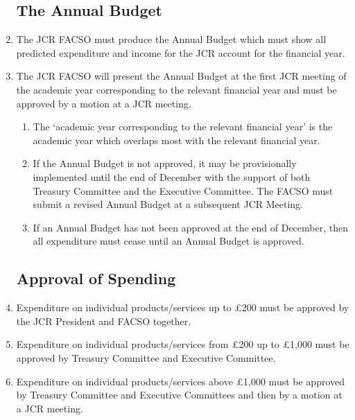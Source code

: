 \documentclass[12pt]{article}  %
\begin{document}
\begin{enumerate}
    \subsection{The Annual Budget}
    \item The JCR FACSO must produce the Annual Budget which must show all predicted expenditure and income for the JCR account for the financial year.
    \item The JCR FACSO will present the Annual Budget at the first JCR meeting of the academic year corresponding to the relevant financial year and must be approved by a motion at a JCR meeting.
    \begin{enumerate}
        \item The ‘academic year corresponding to the relevant financial year’ is the academic year which overlaps most with the relevant financial year.
        \item If the Annual Budget is not approved, it may be provisionally implemented until the end of December with the support of both Treasury Committee and the Executive Committee. The FACSO must submit a revised Annual Budget at a subsequent JCR Meeting.
        \item If an Annual Budget has not been approved at the end of December, then all expenditure must cease until an Annual Budget is approved.
    \end{enumerate}
    \subsection{Approval of Spending}
    \item Expenditure on individual products/services up to £200 must be approved by the JCR President and FACSO together.
    \item Expenditure on individual products/services from £200 up to £1,000 must be approved by Treasury Committee and Executive Committee.
    \item Expenditure on individual products/services above £1,000 must be approved by Treasury Committee and Executive Committees and then by a motion at a JCR meeting.

\end{enumerate}
\end{document}
